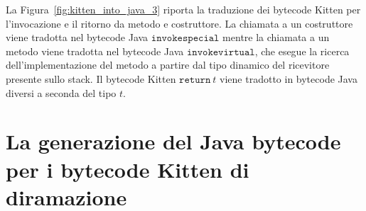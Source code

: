 La Figura~\ref{fig:kitten_into_java_3} riporta la traduzione dei bytecode Kitten per
l'invocazione e il ritorno da metodo e costruttore. La chiamata a un costruttore
viene tradotta nel bytecode Java $\mathtt{invokespecial}$ mentre la chiamata a
un metodo viene tradotta nel bytecode Java $\mathtt{invokevirtual}$, che esegue la
ricerca dell'implementazione del metodo a partire dal tipo dinamico del ricevitore
presente sullo stack. Il bytecode Kitten $\mathtt{return}\ \mathit{t}$ viene tradotto
in bytecode Java diversi a seconda del tipo $\mathit{t}$.

\section{La generazione del Java bytecode per i bytecode Kitten di diramazione}

